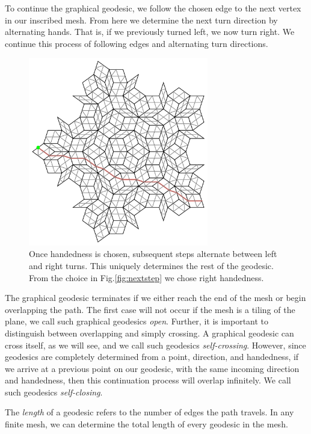 \documentclass[
  oneside,
  11pt, a4paper,
  footinclude=true,
  headinclude=true,
  cleardoublepage=empty
]{scrbook}
\begin{document}
To continue the graphical geodesic, we follow the chosen edge to the next vertex in our inscribed mesh. From here we determine the next turn direction by alternating hands. That is, if we previously turned left, we now turn right. We continue this process of following edges and alternating turn directions. 
\begin{figure}[H]
\centering
\includegraphics[width=0.7\textwidth]{Geodesic}
\caption[Continued Geodesic]{Once handedness is chosen, subsequent steps alternate between left and right turns. This uniquely determines the rest of the geodesic. From the choice in Fig.\ref{fig:nextstep} we chose right handedness.}
\label{fig:geocontinued}
\end{figure}
The graphical geodesic terminates if we either reach the end of the mesh or begin overlapping the path. The first case will not occur if the mesh is a tiling of the plane, we call such graphical geodesics \textit{open}. Further, it is important to distinguish between overlapping and simply crossing. A graphical geodesic can cross itself, as we will see, and we call such geodesics \textit{self-crossing}. However, since geodesics are completely determined from a point, direction, and handedness, if we arrive at a previous point on our geodesic, with the same incoming direction and handedness, then this continuation process will overlap infinitely. We call such geodesics \textit{self-closing}.

The \textit{length} of a geodesic refers to the number of edges the path travels. In any finite mesh, we can determine the total length of every geodesic in the mesh. 
\end{document}
